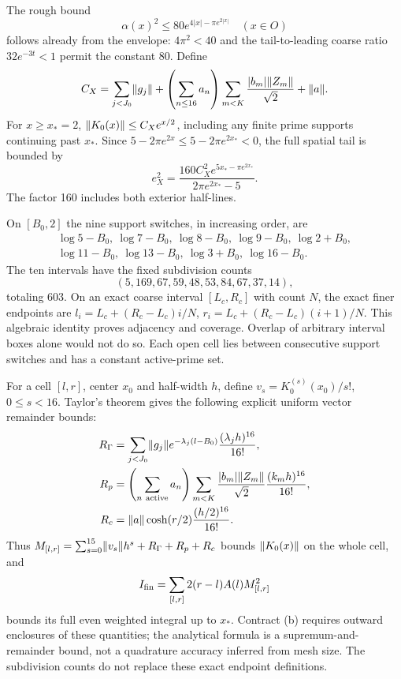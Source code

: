 \documentclass[11pt,a4paper]{article}
\numberwithin{equation}{section}
\theoremstyle{definition}\newtheorem{definition}[theorem]{Definition}
\theoremstyle{remark}\newtheorem{remark}[theorem]{Remark}
\begin{document}
The rough bound
\begin{equation}\label{c:eq:roughalpha}
 \alpha(x)^2\le80e^{4|x|-\pi e^{2|x|}}\quad(x\in O)
\end{equation}
follows already from the envelope: $4\pi^2<40$ and the tail-to-leading
coarse ratio $32e^{-3t}<1$ permit the constant 80.
Define
\[
 C_X=\sum_{j<J_0}\lVert g_j\rVert
 +\left(\sum_{n\le16}a_n\right)
      \sum_{m<K}\frac{|b_m|\lVert Z_m\rVert}{\sqrt2}+\lVert a\rVert.
\]
For $x\ge x_*=2$, $\lVert K_0(x)\rVert\le C_Xe^{x/2}$, including any finite
prime supports continuing past $x_*$. Since
$5-2\pi e^{2x}\le5-2\pi e^{2x_*}<0$, the full spatial tail is bounded by
\begin{equation}\label{c:eq:eX}
 e_X^2=\frac{160C_X^2e^{5x_*-\pi e^{2x_*}}}{2\pi e^{2x_*}-5}.
\end{equation}
The factor 160 includes both exterior half-lines.

On $[{B_0},2]$ the nine support switches, in increasing order, are
\[
 \begin{gathered}\log5-{B_0},\ \log7-{B_0},\ \log8-{B_0},\ \log9-{B_0},\ \log2+{B_0},\\
 \log11-{B_0},\ \log13-{B_0},\ \log3+{B_0},\ \log16-{B_0}.\end{gathered}
\]
The ten intervals have the fixed subdivision counts
\[
 (5,169,67,59,48,53,84,67,37,14),
\]
totaling 603.
On an exact coarse interval $[L_c,R_c]$ with count $N$, the exact finer
endpoints are $l_i=L_c+(R_c-L_c)i/N$, $r_i=L_c+(R_c-L_c)(i+1)/N$.
This algebraic identity proves adjacency and coverage. Overlap of
arbitrary interval boxes alone would not do so. Each open cell lies
between consecutive support switches and has a constant active-prime
set.

For a cell $[l,r]$, center $x_0$ and half-width $h$, define
$v_s=K_0^{(s)}(x_0)/s!$, $0\le s<16$. Taylor's theorem gives the
following explicit uniform vector remainder bounds:
\begin{align*}
 R_\Gamma&=\sum_{j<J_0}\lVert g_j\rVert e^{-\lambda_j(l-{B_0})}
                   \frac{(\lambda_jh)^{16}}{16!},\\
 R_p&=\left(\sum_{n\ {\rm active}}a_n\right)
       \sum_{m<K}\frac{|b_m|\lVert Z_m\rVert}{\sqrt2}
                   \frac{(k_mh)^{16}}{16!},\\
 R_c&=\lVert a\rVert\cosh(r/2)\frac{(h/2)^{16}}{16!}.
\end{align*}
Thus $M_{[l,r]}=\sum_{s=0}^{15}\lVert v_s\rVert h^s+R_\Gamma+R_p+R_c$
bounds $\lVert K_0(x)\rVert$ on the whole cell, and
\begin{equation}\label{c:eq:Ifin}
 I_{\rm fin}=\sum_{[l,r]}2(r-l)A(l)M_{[l,r]}^2
\end{equation}
bounds its full even weighted integral up to $x_*$.
Contract (b) requires outward enclosures of these
quantities; the analytical formula is a supremum-and-remainder bound,
not a quadrature accuracy inferred from mesh size. The subdivision counts do not replace these exact endpoint definitions.
\end{document}

